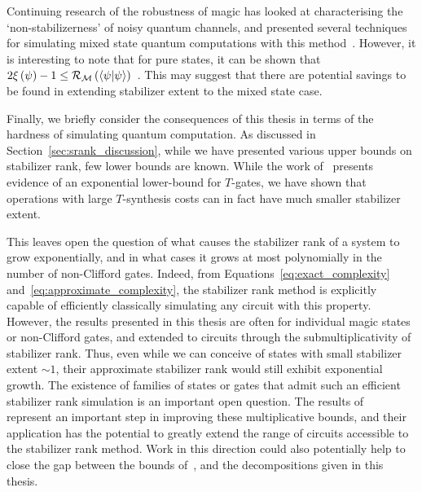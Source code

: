 Continuing research of the robustness of magic has looked at characterising the `non-stabilizerness' of noisy quantum channels, and presented several techniques for simulating mixed state quantum computations with this method~\cite{Seddon2019}. However, it is interesting to note that for pure states, it can be shown that $2 \xi\left(\psi\right) -1 \leq \mathcal{R}_{\mathcal{M}}\left(\braket{\psi}\right)$~\cite{Regula2018}. This may suggest that there are potential savings to be found in extending stabilizer extent to the mixed state case.\par
Finally, we briefly consider the consequences of this thesis in terms of the hardness of simulating quantum computation. As discussed in Section~\ref{sec:srank_discussion}, while we have presented various upper bounds on stabilizer rank, few lower bounds are known. While the work of~\cite{Dalzell2017} presents evidence of an exponential lower-bound for $T$-gates, we have shown that operations with large $T$-synthesis costs can in fact have much smaller stabilizer extent.\par
This leaves open the question of what causes the stabilizer rank of a system to grow exponentially, and in what cases it grows at most polynomially in the number of non-Clifford gates. Indeed, from Equations~\ref{eq:exact_complexity} and~\ref{eq:approximate_complexity}, the stabilizer rank method is explicitly capable of efficiently classically simulating any circuit with this property. However, the results presented in this thesis are often for individual magic states or non-Clifford gates, and extended to circuits through the submultiplicativity of stabilizer rank. Thus, even while we can conceive of states with small stabilizer extent $\sim 1$, their approximate stabilizer rank would still exhibit exponential growth. The existence of families of states or gates that admit such an efficient stabilizer rank simulation is an important open question. The results of~\cite{Qassim2019} represent an important step in improving these multiplicative bounds, and their application has the potential to greatly extend the range of circuits accessible to the stabilizer rank method. Work in this direction could also potentially help to close the gap between the bounds of~\cite{Dalzell2017}, and the decompositions given in this thesis.